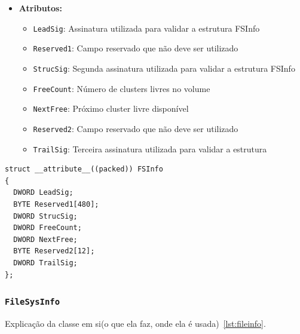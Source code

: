 \documentclass[
    12pt,				%
    oneside,   	        %
    a4paper,			%
    english,			%
    french,				%
    spanish,			%
    brazil,				%
    ]{pacotes/abntex2}
\begin{document}
\begin{itemize}
    \item \textbf{Atributos:}
        \begin{itemize}
            \item \texttt{LeadSig}: Assinatura utilizada para validar a estrutura FSInfo
            \item \texttt{Reserved1}: Campo reservado que não deve ser utilizado
            \item \texttt{StrucSig}: Segunda assinatura utilizada para validar a estrutura FSInfo
            \item \texttt{FreeCount}: Número de clusters livres no volume
            \item \texttt{NextFree}: Próximo cluster livre disponível
            \item \texttt{Reserved2}: Campo reservado que não deve ser utilizado
            \item \texttt{TrailSig}: Terceira assinatura utilizada para validar a estrutura
        \end{itemize}
\end{itemize}


\begin{lstlisting}[caption={Estrutura que representa o FSInfo encontrado no volume FAT}, label={lst:fsinfo}]
struct __attribute__((packed)) FSInfo
{
  DWORD LeadSig;
  BYTE Reserved1[480]; 
  DWORD StrucSig; 
  DWORD FreeCount; 
  DWORD NextFree; 
  BYTE Reserved2[12]; 
  DWORD TrailSig; 
};
\end{lstlisting}

\subsubsection{\texttt{FileSysInfo}}
\label{subsubsec:file_sys_info}

Explicação da classe em si(o que ela faz, onde ela é usada)~\ref{lst:fileinfo}.
\end{document}
